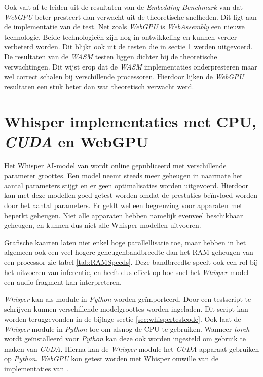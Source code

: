 \bigbreak{}

Ook valt af te leiden uit de resultaten van de \textit{Embedding Benchmark} van \textcite{Lochner2024} dat \textit{WebGPU} beter presteert dan verwacht uit de theoretische snelheden. Dit ligt aan de implementatie van de test. Net zoals \textit{WebGPU} is \textit{WebAssembly} een nieuwe technologie. Beide technologieën zijn nog in ontwikkeling en kunnen verder verbeterd worden. Dit blijkt ook uit de testen die in sectie \ref{sec:whispertest} werden uitgevoerd. De resultaten van de \textit{WASM} testen liggen dichter bij de theoretische verwachtingen. Dit wijst erop dat de \textit{WASM} implementaties onderpresteren maar wel correct schalen bij verschillende processoren. Hierdoor lijken de \textit{WebGPU} resultaten een stuk beter dan wat theoretisch verwacht werd.

\break{}

\section{Whisper implementaties met CPU, \textit{CUDA} en WebGPU}%
\label{sec:whispertest}

Het Whisper AI-model van \textcite{OpenAI2023} wordt online gepubliceerd met verschillende parameter groottes. Een model neemt steeds meer geheugen in naarmate het aantal parameters stijgt en er geen optimalisaties worden uitgevoerd. Hierdoor kan met deze modellen goed getest worden omdat de prestaties beïnvloed worden door het aantal parameters. Er geldt wel een begrenzing voor apparaten met beperkt geheugen. Niet alle apparaten hebben namelijk evenveel beschikbaar geheugen, en kunnen dus niet alle Whisper modellen uitvoeren. 

\bigbreak{}

Grafische kaarten laten niet enkel hoge parallellisatie toe, maar hebben in het algemeen ook een veel hogere geheugenbandbreedte dan het RAM-geheugen van een processor zie tabel \ref{tab:RAMSpeeds}. Deze bandbreedte speelt ook een rol bij het uitvoeren van inferentie, en heeft dus effect op hoe snel het \textit{Whisper} model een audio fragment kan interpreteren.

\bigbreak{}

\textit{Whisper} kan als module in \textit{Python} worden geïmporteerd. Door een testscript te schrijven kunnen verschillende modelgroottes worden ingeladen. Dit script kan worden teruggevonden in de bijlage sectie \ref{sec:whispertestcode}. Ook laat de \textit{Whisper} module in \textit{Python} toe om alsnog de CPU te gebruiken. Wanneer \textit{torch} wordt geïnstalleerd voor \textit{Python} kan deze ook worden ingesteld om gebruik te maken van \textit{CUDA}. Hierna kan de \textit{Whisper} module het \textit{CUDA} apparaat gebruiken op \textit{Python}. \textit{WebGPU} kon getest worden met Whisper omwille van de implementaties van \textcite{Fleetwood2024, Fleetwood2023b}.

